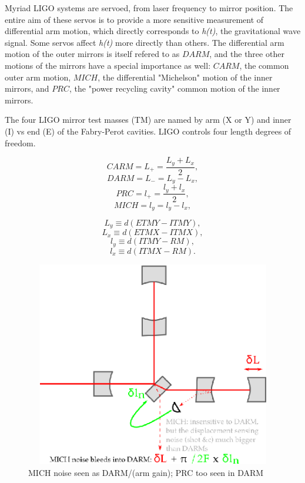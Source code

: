        Myriad LIGO systems are servoed, from laser frequency to mirror position. The entire aim of these servos is to provide a more sensitive measurement of differential arm motion, which directly corresponds to \textit{h(t)}, the gravitational wave signal. Some servos affect \textit{h(t)} more directly than others. The differential arm motion of the outer mirrors is itself refered to as $DARM$, and the three other motions of the mirrors have a special importance as well: $CARM$, the common outer arm motion, $MICH$, the differential "Michelson" motion of the inner mirrors, and $PRC$, the "power recycling cavity" common motion of the inner mirrors.   

The four LIGO mirror test masses (TM) are named by arm (X or Y) and inner (I) vs end (E) of the Fabry-Perot cavities. LIGO controls four length degrees of freedom.

        $$
        \textit{CARM} = L_{+} = \frac{L_y + L_x}{2},
        $$
        $$
        \textit{DARM} = L_{-} = L_y - L_x,
        $$
        $$
        \textit{PRC} = l_{+} = \frac{l_y + l_x}{2},
        $$
        $$
        \textit{MICH} = l_y = l_y - l_x,
        $$

        $$
        L_y \equiv d(\textit{ETMY} - \textit{ITMY}),
        $$
        $$
        L_x \equiv d(\textit{ETMX} - \textit{ITMX}),
        $$
        $$
        l_y \equiv d(\textit{ITMY} - \textit{RM}),
        $$
        $$
        l_x \equiv d(\textit{ITMX} - \textit{RM}).
        $$

\begin{figure}
\includegraphics[height=90mm,width=160mm]{ligo_michdamp.eps}
\caption{MICH noise seen as DARM/(arm gain); PRC too seen in DARM}
\label{arms}
\end{figure}

